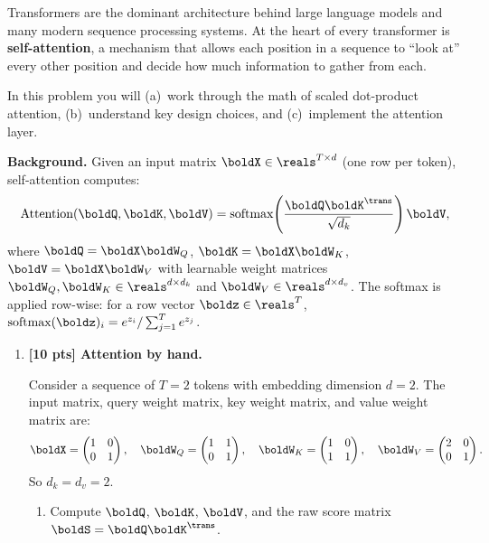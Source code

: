\documentclass[submit]{harvardml}
\begin{document}
\begin{problem}

Transformers are the dominant architecture behind large language models and many modern
sequence processing systems.  At the heart of every transformer is \textbf{self-attention},
a mechanism that allows each position in a sequence to ``look at'' every other position
and decide how much information to gather from each.

In this problem you will (a)~work through the math of scaled dot-product attention,
(b)~understand key design choices, and (c)~implement the attention layer.

\medskip\noindent
\textbf{Background.}
Given an input matrix $\boldX \in \reals^{T \times d}$ (one row per token),
self-attention computes:
\[
  \text{Attention}(\boldQ, \boldK, \boldV)
  = \text{softmax}\!\left(\frac{\boldQ \boldK^\trans}{\sqrt{d_k}}\right)\boldV,
\]
where $\boldQ = \boldX \boldW_Q$, $\boldK = \boldX \boldW_K$,
$\boldV = \boldX \boldW_V$ with learnable weight matrices
$\boldW_Q, \boldW_K \in \reals^{d \times d_k}$ and
$\boldW_V \in \reals^{d \times d_v}$.
The softmax is applied row-wise: for a row vector $\boldz \in \reals^T$,
$\text{softmax}(\boldz)_i = e^{z_i} / \sum_{j=1}^{T} e^{z_j}$.

\begin{enumerate}

\item \textbf{[10 pts] Attention by hand.}

Consider a sequence of $T = 2$ tokens with embedding dimension $d = 2$. The input
matrix, query weight matrix, key weight matrix, and value weight matrix are:
\[
  \boldX = \begin{pmatrix} 1 & 0 \\ 0 & 1 \end{pmatrix}, \quad
  \boldW_Q = \begin{pmatrix} 1 & 1 \\ 0 & 1 \end{pmatrix}, \quad
  \boldW_K = \begin{pmatrix} 1 & 0 \\ 1 & 1 \end{pmatrix}, \quad
  \boldW_V = \begin{pmatrix} 2 & 0 \\ 0 & 1 \end{pmatrix}.
\]
So $d_k = d_v = 2$.

\begin{enumerate}
  \item Compute $\boldQ$, $\boldK$, $\boldV$, and the raw score matrix
  $\boldS = \boldQ \boldK^\trans$.


\end{enumerate}
\end{enumerate}
\end{problem}
\end{document}
